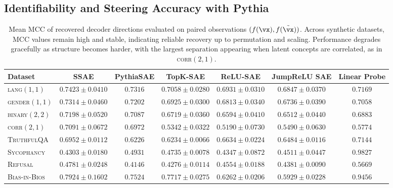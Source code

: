 \documentclass{article}
\begin{document}
\subsection{Identifiability and Steering Accuracy with Pythia}
\label{apx:empirical-pythia}
\begin{table}[ht]
\centering
\caption{
Mean MCC of recovered decoder directions evaluated on paired observations $(f(\vx), f(\tilde{\vx}))$. 
Across synthetic datasets, MCC values remain high and stable, indicating reliable recovery up to permutation and scaling.
Performance degrades gracefully as structure becomes harder, with the largest separation appearing when latent concepts are correlated, as in \textsc{corr}$(2,1)$.
}
\label{tab:mcc_lang_pythia}
\small
\setlength{\tabcolsep}{5pt}
\renewcommand{\arraystretch}{1.15}

\begin{tabular}{lcccccc}
\toprule
\textbf{Dataset} 
& \textbf{SSAE} 
& \textbf{PythiaSAE} 
& \textbf{TopK-SAE} 
& \textbf{ReLU-SAE} 
& \textbf{JumpReLU SAE}
& \textbf{Linear Probe} \\
\midrule
\textsc{lang}$(1,1)$     
& $0.7423 \pm 0.0410$ 
& $0.7316$ 
& $0.7058 \pm 0.0280$ 
& $0.6931 \pm 0.0310$ 
& $0.6847 \pm 0.0370$ 
& $0.7169$ \\
\hdashline
\textsc{gender}$(1,1)$   
& $0.7314 \pm 0.0460$ 
& $0.7202$ 
& $0.6925 \pm 0.0300$ 
& $0.6813 \pm 0.0340$ 
& $0.6736 \pm 0.0390$ 
& $0.7058$ \\
\hdashline
\textsc{binary}$(2,2)$   
& $0.7198 \pm 0.0520$ 
& $0.7087$ 
& $0.6719 \pm 0.0360$ 
& $0.6594 \pm 0.0410$ 
& $0.6512 \pm 0.0440$ 
& $0.6883$ \\
\hdashline
\textsc{corr}$(2,1)$     
& $0.7091 \pm 0.0672$ 
& $0.6972$ 
& $0.5342 \pm 0.0322$ 
& $0.5190 \pm 0.0730$ 
& $0.5490 \pm 0.0630$ 
& $0.5774$ \\
\hdashline
\textsc{TruthfulQA}               
& $0.6952 \pm 0.0112$ 
& $0.6226$ 
& $0.6234 \pm 0.0066$ 
& $0.6634 \pm 0.0224$ 
& $0.6484 \pm 0.0116$ 
& $0.7144$ \\
\hdashline
\textsc{Sycophancy}                
& $0.4303 \pm 0.0180$ 
& $0.4931$ 
& $0.4735 \pm 0.0078$ 
& $0.4347 \pm 0.0872$ 
& $0.4511 \pm 0.0447$ 
& $0.9827$ \\
\hdashline
\textsc{Refusal}                   
& $0.4781 \pm 0.0248$ 
& $0.4146$ 
& $0.4276 \pm 0.0114$ 
& $0.4554 \pm 0.0188$ 
& $0.4381 \pm 0.0090$ 
& $0.5669$ \\
\hdashline
\textsc{Bias-in-Bios}              
& $0.7924 \pm 0.1602$ 
& $0.7524$ 
& $0.7717 \pm 0.0275$ 
& $0.6262 \pm 0.0206$ 
& $0.5929 \pm 0.0228$ 
& $0.9456$ \\
\bottomrule
\end{tabular}
\end{table}
\end{document}
